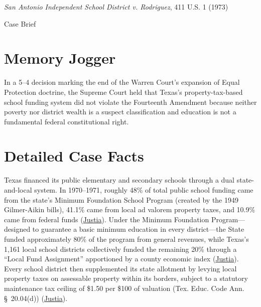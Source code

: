 \documentclass[12pt]{article}
\begin{document}
\begin{center}
{\LARGE \textit{San Antonio Independent School District v. Rodriguez}, 411 U.S. 1 (1973)\par}
\vspace{0.8em}
{\large Case Brief\par}
\end{center}
\vspace{1em}

\section{Memory Jogger}

In a 5--4 decision marking the end of the Warren Court's expansion of Equal Protection doctrine, the Supreme Court held that Texas's property-tax-based school funding system did not violate the Fourteenth Amendment because neither poverty nor district wealth is a suspect classification and education is not a fundamental federal constitutional right.

\section{Detailed Case Facts}

Texas financed its public elementary and secondary schools through a dual state-and-local system. In 1970--1971, roughly 48\% of total public school funding came from the state's Minimum Foundation School Program (created by the 1949 Gilmer-Aikin bills), 41.1\% came from local ad valorem property taxes, and 10.9\% came from federal funds (\href{https://supreme.justia.com/cases/federal/us/411/1/}{Justia}). Under the Minimum Foundation Program---designed to guarantee a basic minimum education in every district---the State funded approximately 80\% of the program from general revenues, while Texas's 1,161 local school districts collectively funded the remaining 20\% through a ``Local Fund Assignment'' apportioned by a county economic index (\href{https://supreme.justia.com/cases/federal/us/411/1/}{Justia}). Every school district then supplemented its state allotment by levying local property taxes on assessable property within its borders, subject to a statutory maintenance tax ceiling of \$1.50 per \$100 of valuation (Tex. Educ. Code Ann. \S~20.04(d)) (\href{https://supreme.justia.com/cases/federal/us/411/1/}{Justia}).
\end{document}
